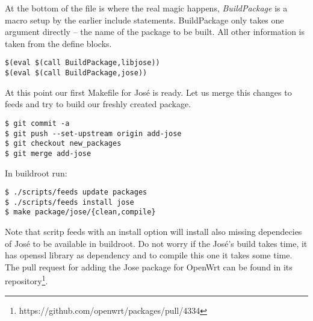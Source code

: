 At the bottom of the file is where the real magic happens, {\it BuildPackage} is a macro setup by the earlier include statements.
BuildPackage only takes one argument directly – the name of the package to be built.
All other information is taken from the define blocks.
\begin{lstlisting}[columns=fixed,basicstyle=\ttfamily\footnotesize,tabsize=4,backgroundcolor=\color{yellow!10}]
$(eval $(call BuildPackage,libjose))
$(eval $(call BuildPackage,jose))
\end{lstlisting}
At this point our first Makefile for José is ready.
Let us merge this changes to feeds and try to build our freshly created package.
\begin{lstlisting}[columns=fixed,basicstyle=\ttfamily\footnotesize,tabsize=4,backgroundcolor=\color{yellow!10}]
$ git commit -a
$ git push --set-upstream origin add-jose
$ git checkout new_packages
$ git merge add-jose
\end{lstlisting}
In buildroot run:
\begin{lstlisting}[columns=fixed,basicstyle=\ttfamily\footnotesize,tabsize=4,backgroundcolor=\color{yellow!10}]
$ ./scripts/feeds update packages
$ ./scripts/feeds install jose
$ make package/jose/{clean,compile}
\end{lstlisting}
Note that scritp feeds with an install option will install also missing dependecies of José to be available in buildroot.
Do not worry if the José's build takes time, it has openssl library as dependency and to compile this one it takes some time.
The pull request for adding the Jose package for OpenWrt can be found in its repository\footnote{https://github.com/openwrt/packages/pull/4334}.
